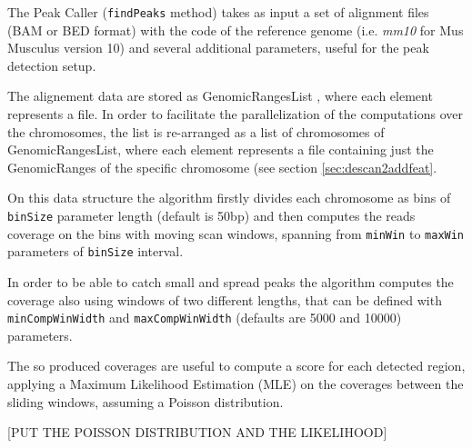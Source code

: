 The Peak Caller (\lstinline{findPeaks} method) takes as input a set of alignment files (BAM \cite{Li2009} or BED format) with the code of the reference genome (i.e. \textit{mm10} for Mus Musculus version 10) and several additional parameters, useful for the peak detection setup.

The alignement data are stored as GenomicRangesList \cite{Lawrence2013}, where each element represents a file. 
In order to facilitate the parallelization of the computations over the chromosomes, the list is re-arranged as a list of chromosomes of GenomicRangesList, where each element represents a file containing just the GenomicRanges of the specific chromosome (see section \ref{sec:descan2addfeat}.

On this data structure the algorithm firstly divides each chromosome as bins of \lstinline{binSize} parameter length (default is 50bp) and then computes the reads coverage on the bins with moving scan windows, spanning from \lstinline{minWin} to \lstinline{maxWin} parameters of \lstinline{binSize} interval.

In order to be able to catch small and spread peaks the algorithm computes the coverage also using windows of two different lengths, that can be defined with \lstinline{minCompWinWidth} and \lstinline{maxCompWinWidth} (defaults are 5000 and 10000) parameters.

The so produced coverages are useful to compute a score for each detected region, applying a Maximum Likelihood Estimation (MLE) on the coverages between the sliding windows, assuming a Poisson distribution.

[PUT THE POISSON DISTRIBUTION AND THE LIKELIHOOD]


